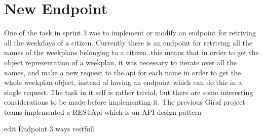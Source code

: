 \section{New Endpoint} \label{sec:webIssue9}

One of the task in sprint 3 was to implement or modify an endpoint for retriving all the weekdays of a citizen. Currently there is an endpoint for retriving all the names of the weekplans belonging to a citizen. this means that in order to get the object representation of a weekplan, it was necessary to iterate over all the names, and make a new request to the api for each name in order to get the whole weekplan object, instead of having an endpoint which can do this in a single request. 
The task in it self is rather trivial, but there are some interesting considerations to be made before implementing it. The previous Giraf project teams implemented a \gls{RESTApi} which is an \gls{API} design pattern 

edit Endpoint
3 ways
restfull